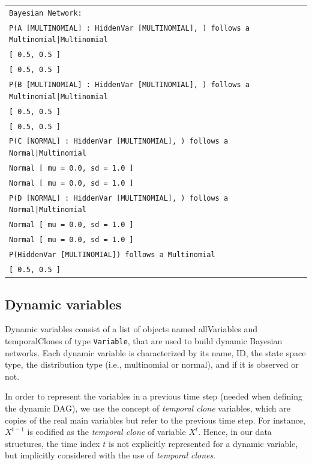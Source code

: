\vspace{-0.1in}
\begin{table}[H]
\small{\begin{tabular}{l} \\
\texttt{Bayesian Network:}\\
\texttt{P(A [MULTINOMIAL] : HiddenVar [MULTINOMIAL], ) follows a Multinomial|Multinomial}\\
\texttt{[ 0.5, 0.5 ]}\\
\texttt{[ 0.5, 0.5 ]}\\
\texttt{P(B [MULTINOMIAL] : HiddenVar [MULTINOMIAL], ) follows a Multinomial|Multinomial}\\
\texttt{[ 0.5, 0.5 ]}\\
\texttt{[ 0.5, 0.5 ]}\\
\texttt{P(C [NORMAL] : HiddenVar [MULTINOMIAL], ) follows a Normal|Multinomial}\\
\texttt{Normal [ mu = 0.0, sd = 1.0 ]}\\
\texttt{Normal [ mu = 0.0, sd = 1.0 ]}\\
\texttt{P(D [NORMAL] : HiddenVar [MULTINOMIAL], ) follows a Normal|Multinomial}\\
\texttt{Normal [ mu = 0.0, sd = 1.0 ]}\\
\texttt{Normal [ mu = 0.0, sd = 1.0 ]}\\
\texttt{P(HiddenVar [MULTINOMIAL]) follows a Multinomial}\\
\texttt{[ 0.5, 0.5 ]}\\
\end{tabular}}
\end{table}

\subsection{Dynamic variables}

Dynamic variables consist of a list of objects named allVariables and temporalClones of type \texttt{Variable}, that are used to build dynamic Bayesian networks. Each dynamic variable is characterized by its name, ID, the state space type, the distribution type (i.e., multinomial or normal), and if it is observed or not. 

In order to represent the variables in a previous time step (needed when defining the dynamic DAG), we use the concept of \textit{temporal clone} variables, which are copies of the real main variables but refer to the previous time step. For instance, $X^{t-1}$ is codified as the \textit{temporal clone} of variable $X^t$. Hence, in our data structures, the time index $t$ is not explicitly represented for a dynamic variable, but implicitly considered with the use of \textit{temporal clones}.

